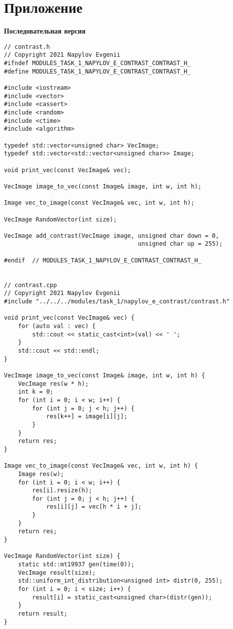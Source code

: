 \documentclass{report}
\begin{document}
	\section*{Приложение}
	\textbf{Последовательная версия}
	\begin{lstlisting}
// contrast.h
// Copyright 2021 Napylov Evgenii
#ifndef MODULES_TASK_1_NAPYLOV_E_CONTRAST_CONTRAST_H_
#define MODULES_TASK_1_NAPYLOV_E_CONTRAST_CONTRAST_H_

#include <iostream>
#include <vector>
#include <cassert>
#include <random>
#include <ctime>
#include <algorithm>

typedef std::vector<unsigned char> VecImage;
typedef std::vector<std::vector<unsigned char>> Image;

void print_vec(const VecImage& vec);

VecImage image_to_vec(const Image& image, int w, int h);

Image vec_to_image(const VecImage& vec, int w, int h);

VecImage RandomVector(int size);

VecImage add_contrast(VecImage image, unsigned char down = 0,
                                      unsigned char up = 255);

#endif  // MODULES_TASK_1_NAPYLOV_E_CONTRAST_CONTRAST_H_


// contrast.cpp
// Copyright 2021 Napylov Evgenii
#include "../../../modules/task_1/napylov_e_contrast/contrast.h"

void print_vec(const VecImage& vec) {
    for (auto val : vec) {
        std::cout << static_cast<int>(val) << ' ';
    }
    std::cout << std::endl;
}

VecImage image_to_vec(const Image& image, int w, int h) {
    VecImage res(w * h);
    int k = 0;
    for (int i = 0; i < w; i++) {
        for (int j = 0; j < h; j++) {
            res[k++] = image[i][j];
        }
    }
    return res;
}

Image vec_to_image(const VecImage& vec, int w, int h) {
    Image res(w);
    for (int i = 0; i < w; i++) {
        res[i].resize(h);
        for (int j = 0; j < h; j++) {
            res[i][j] = vec[h * i + j];
        }
    }
    return res;
}

VecImage RandomVector(int size) {
    static std::mt19937 gen(time(0));
    VecImage result(size);
    std::uniform_int_distribution<unsigned int> distr(0, 255);
    for (int i = 0; i < size; i++) {
        result[i] = static_cast<unsigned char>(distr(gen));
    }
    return result;
}


\end{lstlisting}
\end{document}
